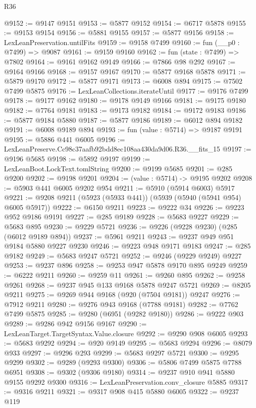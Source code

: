 \begin{lexlean}{R36}
\begin{coremodule}
@9152 := @9147 @9151
@9153 := @5877 @9152
@9154 := @6717 @5878
@9155 := @9153 @9154
@9156 := @5881 @9155
@9157 := @5877 @9156
@9158 := LexLeanPreservation.untilFits
@9159 := @9158 @7499
@9160 := fun (__p0 : @7499) => @9087
@9161 := @9159 @9160
@9162 := fun (state : @7499) => @7802
@9164 := @9161 @9162 @9149
@9166 := @7866 @98 @292
@9167 := @9164 @9166
@9168 := @9157 @9167
@9170 := @5877 @9168 @5878
@9171 := @5879 @9170
@9172 := @5877 @9171
@9173 := @6008 @894
@9175 := @7502 @7499 @5875
@9176 := LexLeanCollections.iterateUntil
@9177 := @9176 @7499
@9178 := @9177 @9162
@9180 := @9178 @9149 @9166
@9181 := @9175 @9180
@9182 := @7764 @9181
@9183 := @9173 @9182
@9184 := @9172 @9183
@9186 := @5877 @9184 @5880
@9187 := @5877 @9186
@9189 := @6012 @894 @9182
@9191 := @6008 @9189 @894
@9193 := fun (value : @5714) => @9187 @9191
@9195 := @5886 @441 @6005
@9196 := LexLeanPreserve.Cc98c37aafb92bdd8ec108aa430da9d06.R36.__fits_15
@9197 := @9196 @5685
@9198 := @5892 @9197
@9199 := LexLeanBoot.LockText.tomlString
@9200 := @9199 @5685
@9201 := @285 @9200
@9202 := @9198 @9201
@9204 := (value : @5714) -> @9195 @9202
@9208 := @5903 @441 @6005 @9202 @954
@9211 := @5910 (@5914 @6003) @5917
@9221 := @9208 @9211 (@5923 (@5933 @441)) (@5939 (@5940 (@5941 @954) @6005 @5917))
@9222 := @6150 @9211
@9223 := @9222 @34
@9226 := @9223 @952 @9186 @9191
@9227 := @285 @9189
@9228 := @5683 @9227
@9229 := @5683 @895
@9230 := @9229 @5721
@9236 := @9226 (@9228 @9230) (@285 (@6012 @9189 @894))
@9237 := @5961 @9211
@9243 := @9237 @949 @951 @9184 @5880 @9227 @9230
@9246 := @9223 @948 @9171 @9183
@9247 := @285 @9182
@9249 := @5683 @9247 @5721
@9252 := @9246 (@9229 @9249) @9227
@9253 := @9237 @896
@9258 := @9253 @947 @5878 @9170 @895 @9249
@9259 := @6222 @9211
@9260 := @9259 @11
@9261 := @9260 @895
@9262 := @9258 @9261
@9268 := @9237 @945 @133 @9168 @5878 @9247 @5721
@9269 := @8205 @9211
@9275 := @9269 @944 @9168 (@920 (@7504 @9181)) @9247
@9276 := @7912 @9211
@9280 := @9276 @943 @9168 (@7788 @9181)
@9282 := @7762 @7499 @5875
@9285 := @9280 (@6951 (@9282 @9180))
@9286 := @9222 @903
@9289 := @9286 @942 @9156 @9167
@9290 := LexLeanTarget.TargetSyntax.Value.closure
@9292 := @9290 @908 @6005
@9293 := @5683 @9292
@9294 := @920 @9149
@9295 := @5683 @9294
@9296 := @8079 @933
@9297 := @9296 @293
@9299 := @5683 @9297 @5721
@9300 := @9295 @9299
@9302 := @9289 (@9293 @9300)
@9306 := @5806 @7499 @5875 @7788 @6951
@9308 := @9302 (@9306 @9180)
@9314 := @9237 @910 @941 @5880 @9155 @9292 @9300
@9316 := LexLeanPreservation.conv_closure @5885
@9317 := @9316 @9211
@9321 := @9317 @908 @415 @5880 @6005
@9322 := @9237 @119

\end{coremodule}
\end{lexlean}
